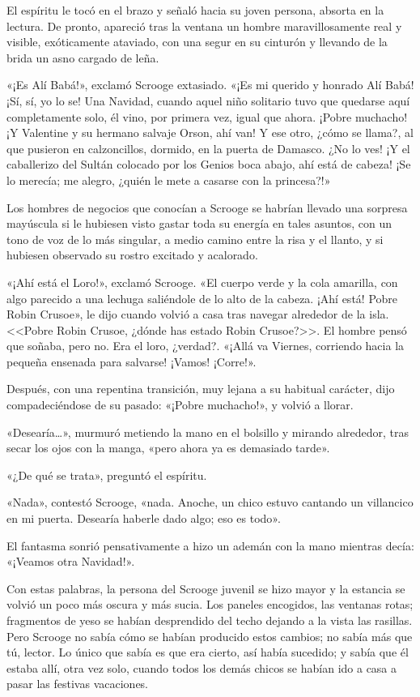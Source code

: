\documentclass{novela}
\begin{document}
 El espíritu le tocó en el brazo y señaló hacia su joven persona, absorta en la lectura. De pronto, apareció tras la ventana un hombre maravillosamente real y visible, exóticamente ataviado, con una segur en su cinturón y llevando de la brida un asno cargado de leña.

 «¡Es Alí Babá!», exclamó Scrooge extasiado. «¡Es mi querido y honrado Alí Babá! ¡Sí, sí, yo lo se! Una Navidad, cuando aquel niño solitario tuvo que quedarse aquí completamente solo, él vino, por primera vez, igual que ahora. ¡Pobre muchacho! ¡Y Valentine y su hermano salvaje Orson, ahí van! Y ese otro, ¿cómo se llama?, al que pusieron en calzoncillos, dormido, en la puerta de Damasco. ¿No lo ves! ¡Y el caballerizo del Sultán colocado por los Genios boca abajo, ahí está de cabeza! ¡Se lo merecía; me alegro, ¿quién le mete a casarse con la princesa?!»

 Los hombres de negocios que conocían a Scrooge se habrían llevado una sorpresa mayúscula si le hubiesen visto gastar toda su energía en tales asuntos, con un tono de voz de lo más singular, a medio camino entre la risa y el llanto, y si hubiesen observado su rostro excitado y acalorado.

 «¡Ahí está el Loro!», exclamó Scrooge. «El cuerpo verde y la cola amarilla, con algo parecido a una lechuga saliéndole de lo alto de la cabeza. ¡Ahí está! Pobre Robin Crusoe», le dijo cuando volvió a casa tras navegar alrededor de la isla. <<Pobre Robin Crusoe, ¿dónde has estado Robin Crusoe?>>. El hombre pensó que soñaba, pero no. Era el loro, ¿verdad?. «¡Allá va Viernes, corriendo hacia la pequeña ensenada para salvarse! ¡Vamos! ¡Corre!».

 Después, con una repentina transición, muy lejana a su habitual carácter, dijo compadeciéndose de su pasado: «¡Pobre muchacho!», y volvió a llorar.

 «Desearía{\ldots}», murmuró metiendo la mano en el bolsillo y mirando alrededor, tras secar los ojos con la manga, «pero ahora ya es demasiado tarde».

 «¿De qué se trata», preguntó el espíritu.

 «Nada», contestó Scrooge, «nada. Anoche, un chico estuvo cantando un villancico en mi puerta. Desearía haberle dado algo; eso es todo».

 El fantasma sonrió pensativamente a hizo un ademán con la mano mientras decía: «¡Veamos otra Navidad!».

 Con estas palabras, la persona del Scrooge juvenil se hizo mayor y la estancia se volvió un poco más oscura y más sucia. Los paneles encogidos, las ventanas rotas; fragmentos de yeso se habían desprendido del techo dejando a la vista las rasillas. Pero Scrooge no sabía cómo se habían producido estos cambios; no sabía más que tú, lector. Lo único que sabía es que era cierto, así había sucedido; y sabía que él estaba allí, otra vez solo, cuando todos los demás chicos se habían ido a casa a pasar las festivas vacaciones.
\end{document}
